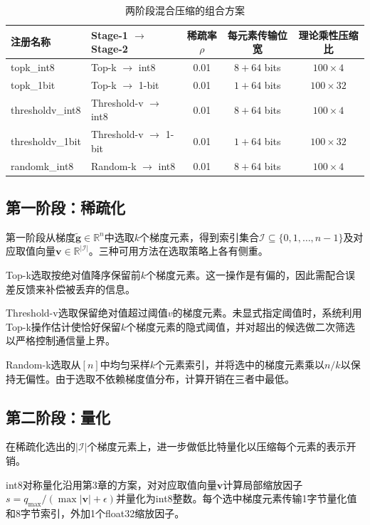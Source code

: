 \begin{table}[htbp]
\caption{两阶段混合压缩的组合方案}
\label{tab:hybrid-combos}
\vspace{0.5em}\centering\wuhao
\begin{tabular}{llccc}
\toprule
注册名称 & Stage-1 \(\to\) Stage-2 & 稀疏率\(\rho\) & 每元素传输位宽 & 理论乘性压缩比 \\
\midrule
topk\_int8     & Top-k \(\to\) int8   & 0.01 & \(8+64\) bits & \(100 \times 4\) \\
topk\_1bit     & Top-k \(\to\) 1-bit  & 0.01 & \(1+64\) bits & \(100 \times 32\) \\
thresholdv\_int8 & Threshold-v \(\to\) int8 & 0.01 & \(8+64\) bits & \(100 \times 4\) \\
thresholdv\_1bit & Threshold-v \(\to\) 1-bit & 0.01 & \(1+64\) bits & \(100 \times 32\) \\
randomk\_int8  & Random-k \(\to\) int8 & 0.01 & \(8+64\) bits & \(100 \times 4\) \\
\bottomrule
\end{tabular}
\end{table}

\subsection{第一阶段：稀疏化}

第一阶段从梯度\(\tilde{\mathbf{g}} \in \mathbb{R}^n\)中选取\(k\)个梯度元素，得到索引集合\(\mathcal{I} \subseteq \{0, 1, \ldots, n-1\}\)及对应取值向量\(\mathbf{v} \in \mathbb{R}^{|\mathcal{I}|}\)。三种可用方法在选取策略上各有侧重。

Top-k选取按绝对值降序保留前\(k\)个梯度元素。这一操作是有偏的，因此需配合误差反馈来补偿被丢弃的信息。

Threshold-v选取保留绝对值超过阈值\(v\)的梯度元素。未显式指定阈值时，系统利用Top-k操作估计使恰好保留\(k\)个梯度元素的隐式阈值，并对超出的候选做二次筛选以严格控制通信量上界。

Random-k选取从\([n]\)中均匀采样\(k\)个元素索引，并将选中的梯度元素乘以\(n/k\)以保持无偏性。由于选取不依赖梯度值分布，计算开销在三者中最低。

\subsection{第二阶段：量化}

在稀疏化选出的\(|\mathcal{I}|\)个梯度元素上，进一步做低比特量化以压缩每个元素的表示开销。

int8对称量化沿用第3章的方案，对对应取值向量\(\mathbf{v}\)计算局部缩放因子\(s = q_{\max} / (\max|\mathbf{v}| + \epsilon)\)并量化为int8整数。每个选中梯度元素传输1字节量化值和8字节索引，外加1个float32缩放因子。

